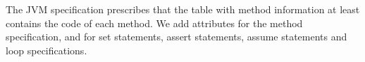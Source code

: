 
The JVM specification prescribes that the table with method
information at least contains the code of each method. We add
attributes for the method specification, and for set statements,
assert statements, assume statements and loop specifications.  

